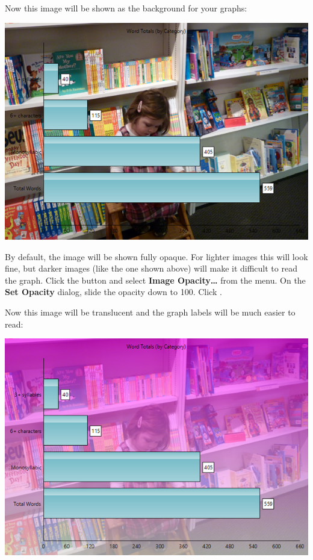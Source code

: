 \documentclass[
]{book}
\theoremstyle{definition}
\theoremstyle{definition}
\theoremstyle{definition}
\theoremstyle{definition}
\theoremstyle{remark}
\begin{document}
Now this image will be shown as the background for your graphs:

\includegraphics{Images/ExampleGraphBackgroundImageChangedTooOpaque.png}

By default, the image will be shown fully opaque. For lighter images this will look fine, but darker images (like the one shown above) will make it difficult to read the graph. Click the  button and select \textbf{Image Opacity\ldots{}} from the menu. On the \textbf{Set Opacity} dialog, slide the opacity down to 100. Click .

Now this image will be translucent and the graph labels will be much easier to read:

\includegraphics{Images/ExampleGraphBackgroundImageChanged.png}
\end{document}

